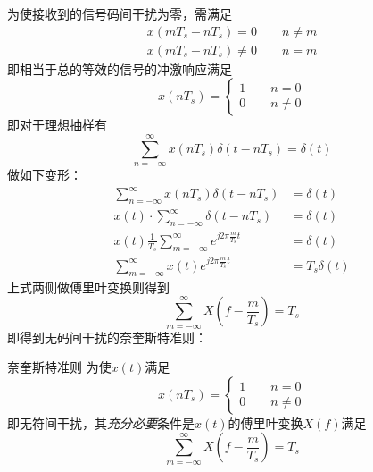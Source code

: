     为使接收到的信号码间干扰为零，需满足
    \begin{equation}
        \begin{split}
            x(mT_s-nT_s)=0\hspace{2em}n\neq m\\
            x(mT_s-nT_s)\neq 0\hspace{2em}n= m
        \end{split}
    \end{equation}
    即相当于总的等效的信号的冲激响应满足
    \begin{equation}
        x(nT_s)=\begin{cases}
            1\hspace{2em}n=0\\
            0\hspace{2em}n\neq 0
        \end{cases}
    \end{equation}
    即对于理想抽样有
    \begin{equation}
        \sum_{n=-\infty}^{\infty}x(nT_s)\delta(t-nT_s)=\delta(t)
    \end{equation}
    做如下变形：
    \begin{equation}
        \begin{split}
            \sum_{n=-\infty}^{\infty}x(nT_s)\delta(t-nT_s)&=\delta(t)\\
            x(t)\cdot\sum_{n=-\infty}^{\infty}\delta(t-nT_s)&=\delta(t)\\
            x(t)\frac{1}{T_s}\sum_{m=-\infty}^{\infty}e^{j2\pi \frac{m}{T_s}t}&=\delta(t)\\
            \sum_{m=-\infty}^{\infty}x(t)e^{j2\pi \frac{m}{T_s}t}&=T_s\delta(t)
        \end{split}
    \end{equation}
    上式两侧做傅里叶变换则得到
    \begin{equation}
        \sum_{m=-\infty}^{\infty}X\left(f-\frac{m}{T_s}\right)=T_s
    \end{equation}
    即得到无码间干扰的奈奎斯特准则：
    \begin{mythm}{奈奎斯特准则}\label{thm:Nyquist}
        为使$x(t)$满足
        \begin{equation}
            x(nT_s)=\begin{cases}
                1\hspace{2em}n=0\\
                0\hspace{2em}n\neq 0
            \end{cases}
        \end{equation}
        即无符间干扰，其\emph{充分必要}条件是$x(t)$的傅里叶变换$X(f)$满足
        \begin{equation}
            \sum_{m=-\infty}^{\infty}X\left(f-\frac{m}{T_s}\right)=T_s
        \end{equation}
    \end{mythm}

